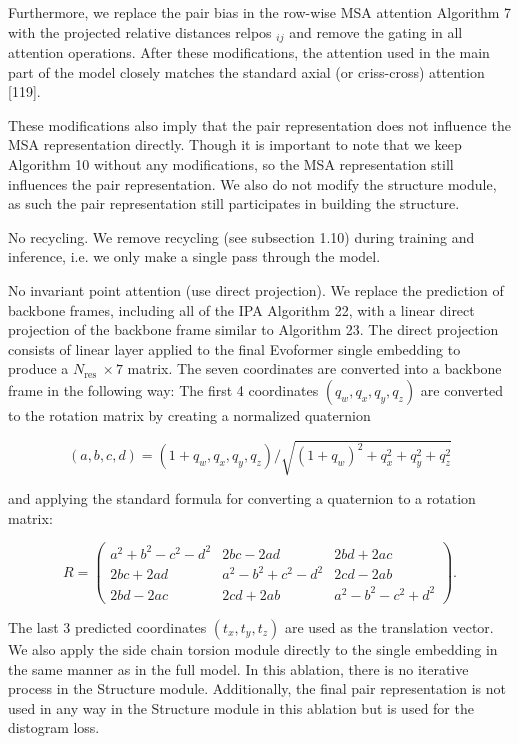\documentclass[10pt]{article}
\begin{document}
Furthermore, we replace the pair bias in the row-wise MSA attention Algorithm 7 with the projected relative distances relpos ${ }_{i j}$ and remove the gating in all attention operations. After these modifications, the attention used in the main part of the model closely matches the standard axial (or criss-cross) attention [119].

These modifications also imply that the pair representation does not influence the MSA representation directly. Though it is important to note that we keep Algorithm 10 without any modifications, so the MSA representation still influences the pair representation. We also do not modify the structure module, as such the pair representation still participates in building the structure.

No recycling. We remove recycling (see subsection 1.10) during training and inference, i.e. we only make a single pass through the model.

No invariant point attention (use direct projection). We replace the prediction of backbone frames, including all of the IPA Algorithm 22, with a linear direct projection of the backbone frame similar to Algorithm 23. The direct projection consists of linear layer applied to the final Evoformer single embedding to produce a $N_{\text {res }} \times 7$ matrix. The seven coordinates are converted into a backbone frame in the following way: The first 4 coordinates $\left(q_{w}, q_{x}, q_{y}, q_{z}\right)$ are converted to the rotation matrix by creating a normalized quaternion


\begin{equation*}
(a, b, c, d)=\left(1+q_{w}, q_{x}, q_{y}, q_{z}\right) / \sqrt{\left(1+q_{w}\right)^{2}+q_{x}^{2}+q_{y}^{2}+q_{z}^{2}} \tag{55}
\end{equation*}


and applying the standard formula for converting a quaternion to a rotation matrix:

\[
R=\left(\begin{array}{ccc}
a^{2}+b^{2}-c^{2}-d^{2} & 2 b c-2 a d & 2 b d+2 a c  \tag{56}\\
2 b c+2 a d & a^{2}-b^{2}+c^{2}-d^{2} & 2 c d-2 a b \\
2 b d-2 a c & 2 c d+2 a b & a^{2}-b^{2}-c^{2}+d^{2}
\end{array}\right) .
\]

The last 3 predicted coordinates $\left(t_{x}, t_{y}, t_{z}\right)$ are used as the translation vector. We also apply the side chain torsion module directly to the single embedding in the same manner as in the full model. In this ablation, there is no iterative process in the Structure module. Additionally, the final pair representation is not used in any way in the Structure module in this ablation but is used for the distogram loss.
\end{document}
